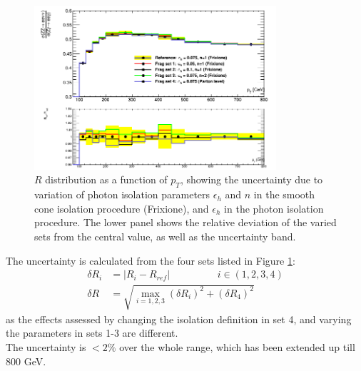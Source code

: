 \documentclass[11pt,a4paper]{report}
\begin{document}
\begin{figure}[H]
\centering
	\includegraphics[width=0.8\textwidth]{frag.png}
	\caption{$R$ distribution as a function of $p_T$, showing the uncertainty due to variation of photon isolation parameters $\epsilon_h$ and $n$ in the smooth cone isolation procedure (Frixione), and $\epsilon_h$ in the photon isolation procedure. The lower panel shows the relative deviation of the varied sets from the central value, as well as the uncertainty band.}
	\label{fig:photon_frag}
\end{figure}

The uncertainty is calculated from the four sets listed in Figure \ref{fig:photon_frag}:
\begin{equation}
\begin{split}
\delta R_i &= |R_i - R_{ref}| \hspace{2cm}  i \in (1,2,3,4)\\
\delta R &= \sqrt{\max_{i=1,2,3}(\delta R_i)^2 + (\delta R_4)^2}
\end{split}
\end{equation}
as the effects assessed by changing the isolation definition in set 4, and varying the parameters in sets 1-3 are different.\\
The uncertainty is $< 2\%$ over the whole range, which has been extended up till 800 GeV.
\end{document}
